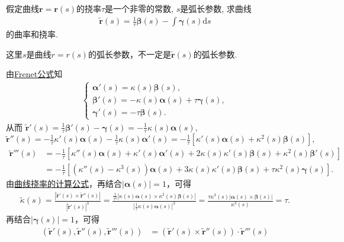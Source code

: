 \documentclass[../../main.tex]{subfiles}%
\begin{document}
\begin{example}
假定曲线$\bm{r} = \bm{r}(s)$的挠率$\tau$是一个非零的常数, $s$是弧长参数, 求曲线
\begin{align*}
\tilde{\bm{r}}(s) = \frac{1}{\tau}\bm{\beta}(s) - \int \bm{\gamma}(s)\mathrm{d}s
\end{align*}
的曲率和挠率.
\end{example}
\begin{remark}
这里$s$是曲线$r=r(s)$的弧长参数，不一定是$\tilde{\bm{r}}(s)$的弧长参数.
\end{remark}
\begin{solution}
由\hyperref[theorem:微分几何-Frenet公式]{Frenet公式}知
\begin{align*}
\begin{cases}
\bm{\alpha}'(s) = \kappa(s)\bm{\beta}(s),\\
\bm{\beta}'(s) = -\kappa(s)\bm{\alpha}(s) + \tau\bm{\gamma}(s),\\
\bm{\gamma}'(s) = -\tau\bm{\beta}(s).
\end{cases}
\end{align*}
从而
$\widetilde{\bm{r}}'(s) = \frac{1}{\tau}\bm{\beta}'(s) - \bm{\gamma}(s) = -\frac{1}{\tau}\kappa(s)\bm{\alpha}(s),$
$\widetilde{\bm{r}}''(s) = -\frac{1}{\tau}\kappa'(s)\bm{\alpha}(s) - \frac{1}{\tau}\kappa(s)\bm{\alpha}'(s) = -\frac{1}{\tau}\left[\kappa'(s)\bm{\alpha}(s) + \kappa^2(s)\bm{\beta}(s)\right],$
\begin{align*}
\widetilde{\bm{r}}'''(s) &= -\frac{1}{\tau}\left[\kappa''(s)\bm{\alpha}(s) + \kappa'(s)\bm{\alpha}'(s) + 2\kappa(s)\kappa'(s)\bm{\beta}(s) + \kappa^2(s)\bm{\beta}'(s)\right]\\
&= -\frac{1}{\tau}\left[\left(\kappa''(s) - \kappa^3(s)\right)\bm{\alpha}(s) + 3\kappa(s)\kappa'(s)\bm{\beta}(s) + \tau\kappa^2(s)\bm{\gamma}(s)\right].
\end{align*}
由\hyperref[theorem:微分几何-曲线挠率的计算公式]{曲线挠率的计算公式}，再结合$|\bm{\alpha}(s)|=1$，可得
\begin{align*}
\widetilde{\kappa}(s) = \frac{|\widetilde{\bm{r}}'(s) \times \widetilde{\bm{r}}''(s)|}{|\widetilde{\bm{r}}'(s)|^3} = \frac{\frac{1}{\tau^2}|\kappa(s)\bm{\alpha}(s) \times \kappa^2(s)\bm{\beta}(s)|}{\left|\frac{1}{\tau}\kappa(s)\bm{\alpha}(s)\right|^3} = \frac{\tau\kappa^3(s)|\bm{\alpha}(s) \times \bm{\beta}(s)|}{\kappa^3(s)} = \tau.
\end{align*}
再结合$|\bm{\gamma}(s)|=1$，可得
\begin{align*}
\left(\widetilde{\bm{r}}'(s), \widetilde{\bm{r}}''(s), \widetilde{\bm{r}}'''(s)\right) &= \left(\widetilde{\bm{r}}'(s) \times \widetilde{\bm{r}}''(s)\right) \cdot \widetilde{\bm{r}}'''(s)\\

\end{align*}
\end{solution}
\end{document}
